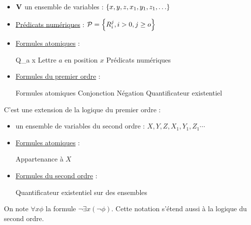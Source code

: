 \begin{definition} 
	\begin{itemize}
		\item $\mathbf{V}$ un ensemble de variables : $\left\{x,y,z,x_1,y_1,z_1, \ldots\right\}$
		\item \underline{Prédicats numériques} :  $\mathcal{P} = \left\{R_i^j, i > 0, j \geq o\right\}$
		\item \underline{Formules atomiques} :
		      \begin{syntaxdef}
			      \syntaxHeader {\alpha} {Q_a x} {Lettre $a$ en position $x$}
			       {Prédicats numériques}
		      \end{syntaxdef}
		\item \underline{Formules du premier ordre} :
		      \begin{syntaxdef}
			      \syntaxHeader {\phi} {\alpha} {Formules atomiques}
			      \syntax {\phi \land \phi} {Conjonction}
			      \syntax {\lnot \phi} {Négation}
			       {Quantificateur existentiel}
		      \end{syntaxdef}
	\end{itemize}
\end{definition}


\begin{definition} 
	C'est une extension de la logique du premier ordre :
	\begin{itemize}
		\item un ensemble de variables du second ordre : $X,Y,Z,X_1,Y_1,Z_1 \cdots$
		\item \underline{Formules atomiques} :
		      \begin{syntaxdef}
			      \syntaxExtension{\alpha}
			       {Appartenance à $X$}
		      \end{syntaxdef}
		\item \underline{Formules du second ordre} :
		      \begin{syntaxdef}
			      \syntaxExtension{\phi}
			       {Quantificateur existentiel sur des ensembles}
		      \end{syntaxdef}
	\end{itemize}
\end{definition}


\begin{notation}
	On note $\forall x \phi$ la formule $\lnot \exists x (\lnot \phi)$. Cette notation s'étend aussi
	à la logique du second ordre.
\end{notation}

